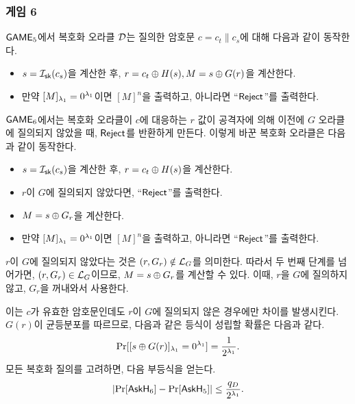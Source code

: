 \newpage
\subsubsection{게임 6}

$\textsf{GAME}_5$에서 복호화 오라클 $\mathcal{D}$는 질의한 암호문 $c = c_t \parallel c_s$에 대해 다음과 같이 동작한다.
\begin{tcolorbox}
	\begin{itemize}
		\item $s = \mathcal{I}_{\textsf{sk}}(c_s)$을 계산한 후, $r = c_t \oplus H(s), M = s
		\oplus G(r)$을 계산한다.
		\item 만약 $[M]_{\lambda_1} = 0^{\lambda_1}$이면 $[M]^{n}$을 출력하고,
		아니라면 “$\textsf{Reject}$”를 출력한다.
	\end{itemize}
\end{tcolorbox}

$\textsf{GAME}_6$에서는 복호화 오라클이 $c$에 대응하는 $r$ 값이 공격자에 의해 이전에 $G$
오라클에 질의되지 않았을 때, $\textsf{Reject}$를 반환하게 만든다. 이렇게 바꾼 복호화
오라클은 다음과 같이 동작한다.

\begin{tcolorbox}
	\begin{itemize}
		\item $s = \mathcal{I}_{\textsf{sk}}(c_s)$을 계산한 후, $r = c_t \oplus H(s)$을 계산한다.
		\item $r$이 $G$에 질의되지 않았다면, “$\textsf{Reject}$”를 출력한다.
		\item $M = s \oplus G_r$을 계산한다.
		\item 만약 $[M]_{\lambda_1} = 0^{\lambda_1}$이면 $[M]^{n}$을 출력하고,
		아니라면 “$\textsf{Reject}$”를 출력한다.
	\end{itemize}
\end{tcolorbox}

\begin{memo}
	$r$이 $G$에 질의되지 않았다는 것은 $(r, G_r) \notin \mathcal{L}_G$를 의미한다.
	따라서 두 번째 단계를 넘어가면, $(r, G_r) \in \mathcal{L}_G$이므로, $M = s \oplus
	G_r$를 계산할 수 있다. 이때, $r$을 $G$에 질의하지 않고, $G_r$을 꺼내와서
	사용한다.
\end{memo}

이는 $c$가 유효한 암호문인데도 $r$이 $G$에 질의되지 않은 경우에만 차이를
발생시킨다. $G(r)$이 균등분포를 따르므로, 다음과 같은 등식이 성립할 확률은
다음과 같다.
$$
	\Pr[[s \oplus G(r)]_{\lambda_1} = 0^{\lambda_1}] = \frac{1}{2^{\lambda_1}}.
$$
모든 복호화 질의를 고려하면, 다음 부등식을 얻는다.
$$	
	\left| \Pr[\textsf{AskH}_6] - \Pr[\textsf{AskH}_5] \right| \leq \frac{q_D}{2^{\lambda_1}}.
$$

